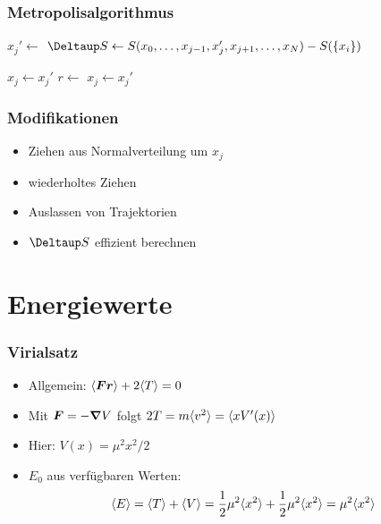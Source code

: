 \documentclass[ngerman, fleqn]{beamer}
\newcommand\timesites{N}
\begin{document}
\begin{frame}
    \frametitle{Metropolisalgorithmus}
    
    \begin{algorithmic}
        \For{$j \gets 1, \ldots, \timesites$}
            \State $x_j' \gets$ 
            \State $\Deltaup S \gets S(x_0, \ldots, x_{j-1}, x_j',
            x_{j+1}, \ldots, x_\timesites) - S(\{x_i\})$

                \State $x_j \gets x_j'$
            \Else
                \State $r \gets$ 
                    \State $x_j \gets x_j'$
                \EndIf
            \EndIf
        \EndFor
    \end{algorithmic}
\end{frame}

\begin{frame}
    \frametitle{Modifikationen}

    \begin{itemize}
        \item
            Ziehen aus Normalverteilung um $x_j$

        \item
            wiederholtes Ziehen

        \item
            Auslassen von Trajektorien

        \item
            $\Deltaup S$ effizient berechnen
    \end{itemize}
\end{frame}

\section{Energiewerte}

\begin{frame}
    \frametitle{Virialsatz}

    \begin{itemize}
    
        \item
    Allgemein: $\langle \boldsymbol{F} \boldsymbol{r} \rangle + 2 \langle T \rangle = 0$

\item
    Mit $\boldsymbol{F} = - \boldsymbol{\nabla} V$ folgt $2 T = m \langle v^2 \rangle = \langle x V'(x) \rangle$

\item
    Hier: $V(x) = \mu^2 x^2 /2$

\item
    $E_0$ aus verfügbaren Werten:
    \[
        \langle E \rangle = \langle T \rangle + \langle V \rangle
        = \frac12 \mu^2 \langle x^2 \rangle + \frac12 \mu^2 \langle x^2 \rangle
        = \mu^2 \langle x^2 \rangle
    \]
    \end{itemize}
\end{frame}
\end{document}
